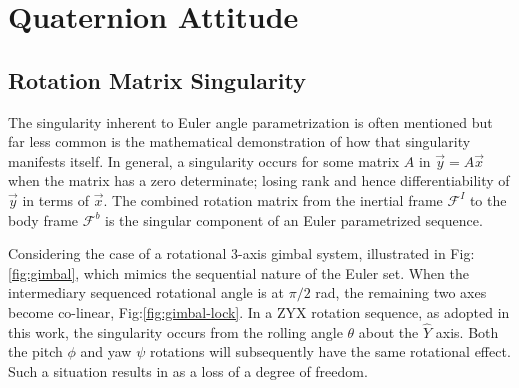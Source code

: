 \section{Quaternion Attitude}
\subsection{Rotation Matrix Singularity}\label{subsec:dynamics.rigidbody.singularity}
The singularity inherent to Euler angle parametrization is often mentioned but far less common is the mathematical demonstration of how that singularity manifests itself.  In general, a singularity occurs for some matrix $A$ in $\vec{y}=A\vec{x}$ when the matrix has a zero determinate; losing rank and hence differentiability of $\vec{y}$ in terms of $\vec{x}$. The combined rotation matrix from the inertial frame $\mathcal{F}^{I}$ to the body frame $\mathcal{F}^{b}$ is the singular component of an Euler parametrized sequence. 
\par
Considering the case of a rotational 3-axis gimbal system, illustrated in Fig:\ref{fig:gimbal}, which mimics the sequential nature of the Euler set. When the intermediary sequenced rotational angle is at $\pi/2$ rad, the remaining two axes become co-linear, Fig:\ref{fig:gimbal-lock}. In a ZYX rotation sequence, as adopted in this work, the singularity occurs from the rolling angle $\theta$ about the $\hat{Y}$ axis. Both the pitch $\phi$ and yaw $\psi$ rotations will subsequently have the same rotational effect. Such a situation results in as a loss of a degree of freedom.
\newpage
